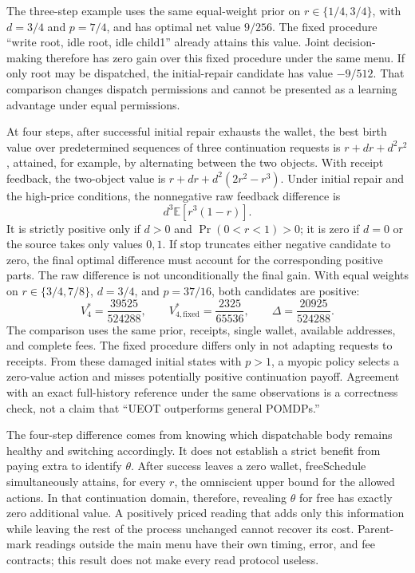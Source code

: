 \documentclass[
  english,
  11pt,
  oneside]{book}
\begin{document}
The three-step example uses the same equal-weight prior on \(r\in\{1/4,3/4\}\), with \(d=3/4\) and \(p=7/4\), and has optimal net value \(9/256\). The fixed procedure ``write root, idle root, idle child1'' already attains this value. Joint decision-making therefore has zero gain over this fixed procedure under the same menu. If only root may be dispatched, the initial-repair candidate has value \(-9/512\). That comparison changes dispatch permissions and cannot be presented as a learning advantage under equal permissions.

At four steps, after successful initial repair exhausts the wallet, the best birth value over predetermined sequences of three continuation requests is \(r+dr+d^2r^2\), attained, for example, by alternating between the two objects. With receipt feedback, the two-object value is \(r+dr+d^2(2r^2-r^3)\). Under initial repair and the high-price conditions, the nonnegative raw feedback difference is \[d^3\mathbb E[r^3(1-r)].\] It is strictly positive only if \(d>0\) and \(\Pr(0<r<1)>0\); it is zero if \(d=0\) or the source takes only values \(0,1\). If stop truncates either negative candidate to zero, the final optimal difference must account for the corresponding positive parts. The raw difference is not unconditionally the final gain. With equal weights on \(r\in\{3/4,7/8\}\), \(d=3/4\), and \(p=37/16\), both candidates are positive: \[V_4^*=\frac{39525}{524288},\qquad
V_{4,\mathrm{fixed}}^*=\frac{2325}{65536},\qquad
\Delta=\frac{20925}{524288}.\] The comparison uses the same prior, receipts, single wallet, available addresses, and complete fees. The fixed procedure differs only in not adapting requests to receipts. From these damaged initial states with \(p>1\), a myopic policy selects a zero-value action and misses potentially positive continuation payoff. Agreement with an exact full-history reference under the same observations is a correctness check, not a claim that ``UEOT outperforms general POMDPs.''

The four-step difference comes from knowing which dispatchable body remains healthy and switching accordingly. It does not establish a strict benefit from paying extra to identify \(\theta\). After success leaves a zero wallet, freeSchedule simultaneously attains, for every \(r\), the omniscient upper bound for the allowed actions. In that continuation domain, therefore, revealing \(\theta\) for free has exactly zero additional value. A positively priced reading that adds only this information while leaving the rest of the process unchanged cannot recover its cost. Parent-mark readings outside the main menu have their own timing, error, and fee contracts; this result does not make every read protocol useless.
\end{document}
